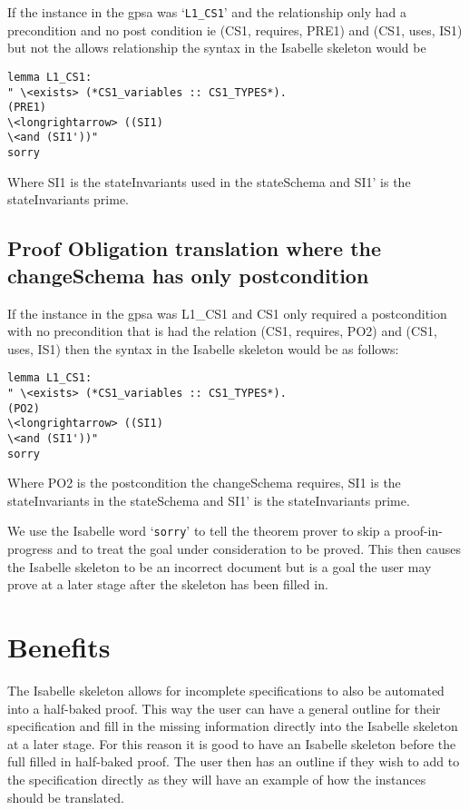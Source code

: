 If the instance in the \gls{gpsa} was `\texttt{L1\_CS1}' and the relationship only had a precondition and no post condition ie (CS1, requires, PRE1) and (CS1, uses, IS1) but not the allows relationship the syntax in the Isabelle skeleton would be 

\begin{verbatim}
lemma L1_CS1:
" \<exists> (*CS1_variables :: CS1_TYPES*).
(PRE1)
\<longrightarrow> ((SI1)
\<and (SI1'))"
sorry
\end{verbatim}

Where SI1 is the stateInvariants used in the stateSchema and SI1' is the stateInvariants prime.

\subsection{Proof Obligation translation where the changeSchema has only postcondition}

If the instance in the \gls{gpsa} was L1\_CS1 and CS1 only required a postcondition with no precondition that is had the relation (CS1, requires, PO2) and (CS1, uses, IS1) then the syntax in the Isabelle skeleton would be as follows:

\begin{verbatim}
lemma L1_CS1:
" \<exists> (*CS1_variables :: CS1_TYPES*).
(PO2)
\<longrightarrow> ((SI1)
\<and (SI1'))"
sorry
\end{verbatim}

Where PO2 is the postcondition the changeSchema requires, SI1 is the stateInvariants in the stateSchema and SI1' is the stateInvariants prime. 

We use the Isabelle word `\texttt{sorry}' to tell the theorem prover to skip a proof-in-progress and to treat the goal under consideration to be proved. This then causes the Isabelle skeleton to be an incorrect document but is a goal the user may prove at a later stage after the skeleton has been filled in.

\section{Benefits}


The Isabelle skeleton allows for incomplete specifications to also be automated into a half-baked proof. This way the user can have a general outline for their specification and fill in the missing information directly into the Isabelle skeleton at a later stage. For this reason it is good to have an Isabelle skeleton before the full filled in half-baked proof. The user then has an outline if they wish to add to the specification directly as they will have an example of how the instances should be translated.

